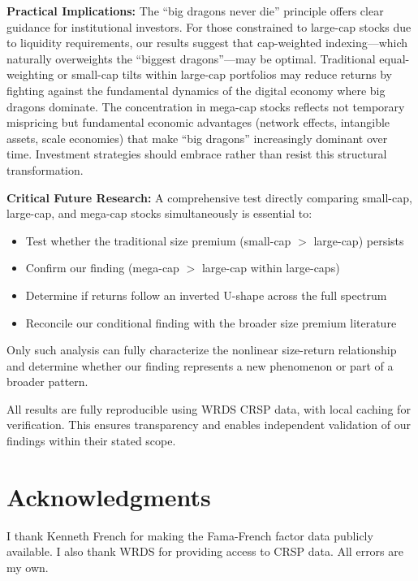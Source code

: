\documentclass[10pt,letterpaper]{article}
\begin{document}
\textbf{Practical Implications:} The ``big dragons never die'' principle offers clear guidance for institutional investors. For those constrained to large-cap stocks due to liquidity requirements, our results suggest that cap-weighted indexing---which naturally overweights the ``biggest dragons''---may be optimal. Traditional equal-weighting or small-cap tilts within large-cap portfolios may reduce returns by fighting against the fundamental dynamics of the digital economy where big dragons dominate. The concentration in mega-cap stocks reflects not temporary mispricing but fundamental economic advantages (network effects, intangible assets, scale economies) that make ``big dragons'' increasingly dominant over time. Investment strategies should embrace rather than resist this structural transformation.

\textbf{Critical Future Research:} A comprehensive test directly comparing small-cap, large-cap, and mega-cap stocks simultaneously is essential to:
\begin{itemize}
\item Test whether the traditional size premium (small-cap $>$ large-cap) persists
\item Confirm our finding (mega-cap $>$ large-cap within large-caps)
\item Determine if returns follow an inverted U-shape across the full spectrum
\item Reconcile our conditional finding with the broader size premium literature
\end{itemize}
Only such analysis can fully characterize the nonlinear size-return relationship and determine whether our finding represents a new phenomenon or part of a broader pattern.

All results are fully reproducible using WRDS CRSP data, with local caching for verification. This ensures transparency and enables independent validation of our findings within their stated scope.

\section*{Acknowledgments}

I thank Kenneth French for making the Fama-French factor data publicly available. I also thank WRDS for providing access to CRSP data. All errors are my own.

\nolinenumbers


\end{document}
